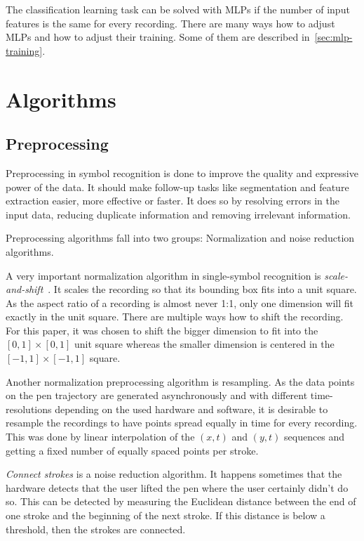 \documentclass[9pt,technote]{IEEEtran}
\begin{document}
The classification learning task can be solved with \glspl{MLP} if the number
of input features is the same for every recording. There are many ways how to
adjust \glspl{MLP} and how to adjust their training. Some of them are
described in~\cref{sec:mlp-training}.

\section{Algorithms}
\subsection{Preprocessing}\label{sec:preprocessing}
Preprocessing in symbol recognition is done to improve the quality and
expressive power of the data. It should make follow-up tasks like segmentation
and feature extraction easier, more effective or faster. It does so by resolving
errors in the input data, reducing duplicate information and removing irrelevant
information.

Preprocessing algorithms fall into two groups: Normalization and noise
reduction algorithms.

A very important normalization algorithm in single-symbol recognition is
\textit{scale-and-shift}~\cite{Thoma:2014}. It scales the recording so that
its bounding box fits into a unit square. As the aspect ratio of a recording
is almost never 1:1, only one dimension will fit exactly in the unit square.
There are multiple ways how to shift the recording. For this paper, it was
chosen to shift the bigger dimension to fit into the $[0,1] \times [0,1]$ unit
square whereas the smaller dimension is centered in the $[-1,1] \times [-1,1]$
square.

Another normalization preprocessing algorithm is resampling. As the data points
on the pen trajectory are generated asynchronously and with different
time-resolutions depending on the used hardware and software, it is desirable
to resample the recordings to have points spread equally in time for every
recording. This was done by linear interpolation of the $(x,t)$ and $(y,t)$
sequences and getting a fixed number of equally spaced points per stroke.

\textit{Connect strokes} is a noise reduction algorithm. It happens sometimes
that the hardware detects that the user lifted the pen where the user certainly
didn't do so. This can be detected by measuring the Euclidean distance between
the end of one stroke and the beginning of the next stroke. If this distance is
below a threshold, then the strokes are connected.
\end{document}
